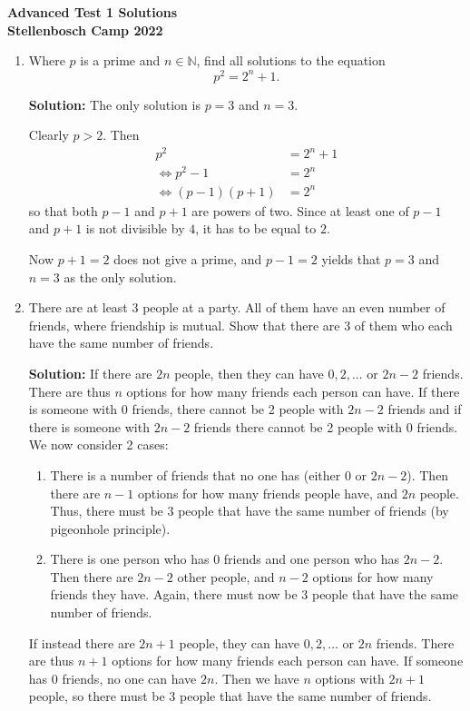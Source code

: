 \documentclass{article}
\begin{document}
\thispagestyle{empty}

\begin{center}
  \textbf{\Large Advanced Test 1 Solutions}
  \\ \vspace{1em}
  \textbf{\large Stellenbosch Camp 2022}
\end{center}

\bigskip

\begin{enumerate}[itemsep=24pt]
\item %
Where $p$ is a prime and $n\in\mathbb{N}$, find all solutions to the equation \[p^2 = 2^n + 1.\]

\textbf{Solution:} The only solution is $p = 3$ and $n = 3$.

Clearly $p>2$. Then 
\begin{align*}
	p^2 &= 2^n + 1
	\\ \iff p^2-1 &= 2^n
	\\ \iff (p-1)(p+1) &= 2^n
\end{align*}
so that both $p-1$ and $p+1$ are powers of two. Since at least one of $p-1$ and $p+1$ is not divisible by $4$, it has to be equal to $2$.

Now $p+1 = 2$ does not give a prime, and $p-1 = 2$ yields that $p =3$ and $n=3$ as the only solution.


\item %
There are at least 3 people at a party. All of them have an even number of friends, where friendship is mutual. Show that there are 3 of them who each have the same number of friends.

\textbf{Solution:} If there are $2n$ people, then they can have $0,2,...$ or $2n-2$ friends. There are thus $n$ options for how many friends each person can have. If there is someone with 0 friends, there cannot be 2 people with $2n-2$ friends and if there is someone with $2n-2$ friends there cannot be 2 people with 0 friends. We now consider 2 cases:
\begin{enumerate}
\item There is a number of friends that no one has (either 0 or $2n-2$). Then there are $n-1$ options for how many friends people have, and $2n$ people. Thus, there must be 3 people that have the same number of friends (by pigeonhole principle).
\item There is one person who has 0 friends and one person who has $2n-2$. Then there are $2n-2$ other people, and $n-2$ options for how many friends they have. Again, there must now be 3 people that have the same number of friends.
\end{enumerate}
If instead there are $2n+1$ people, they can have $0,2,...$ or $2n$ friends. There are thus $n+1$ options for how many friends each person can have. If someone has 0 friends, no one can have $2n$. Then we have $n$ options with $2n+1$ people, so there must be 3 people that have the same number of friends.



\end{enumerate}
\end{document}
